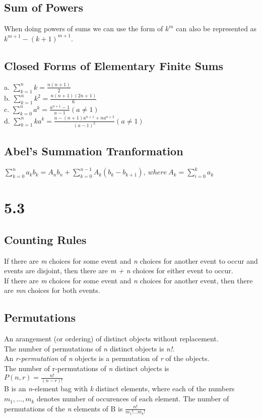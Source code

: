 \documentclass[10pt,twocolumn]{article}
\begin{document}
	\subsection*{Sum of Powers}
	When doing powers of sums we can use the form of $k^m$ can also be
	represented as $k^{m+1} - ( k + 1)^{m+1}$.

	\subsection*{Closed Forms of Elementary Finite Sums}
	a. $\displaystyle\sum_{k=1}^n k = \frac{n(n+1)}{2}$\\
	b. $\displaystyle\sum_{k=1}^n k^2 = \frac{n(n+1)(2n+1)}{6}$\\
	c. $\displaystyle\sum_{k=0}^n a^k = \frac{a^{n+1} - 1}{a -1} ( a \neq
	1)$\\
	d. $\displaystyle\sum_{k=1}^n ka^k = \frac{a - (n + 1)a^{n+1} +
	  na^{n+2}}{(a-1)^2} (a \neq 1)$\\

	\subsection*{Abel's Summation Tranformation}
	$\displaystyle\sum_{k=0}^n a_kb_k = \mathit{A}_nb_n + \sum_{k=0}^{n-1}
	\mathit{A}_k(b_k - b_{k+1}),  \:where\:A_k = \sum_{i=0}^k a_k$\\
	

	\section*{5.3}
	
	\subsection*{Counting Rules}
	If there are \textit{m} choices for some event and \textit{n} choices for another event to occur and events are disjoint, then there are \textit{m + n} choices for either event to occur. \\
	If there are \textit{m} choices for some event and \textit{n} choices for another event, then there are \textit{mn} choices for both events.
	\subsection*{Permutations}
	An arangement (or ordering) of distinct objects without replacement. \\
	The number of permutations of \textit{n} distinct objects is \textit{n!}. \\
	An \textit{r-permutation} of \textit{n} objects is a permutation of \textit{r} of the objects. \\
	The number of r-permutations of \textit{n} distinct objects is \\
	$P(n, r)=\frac{n!}{(n - r)!}$ \\
	B is an \textit{n}-element bag with \textit{k} distinct elements, where each of the numbers $m_1,\ldots,m_k$ denotes number of occurences of each element.  The number of permutations of the \textit{n} elements of B is $\frac{n!}{m_1! \ldots m_k!}$
\end{document}
